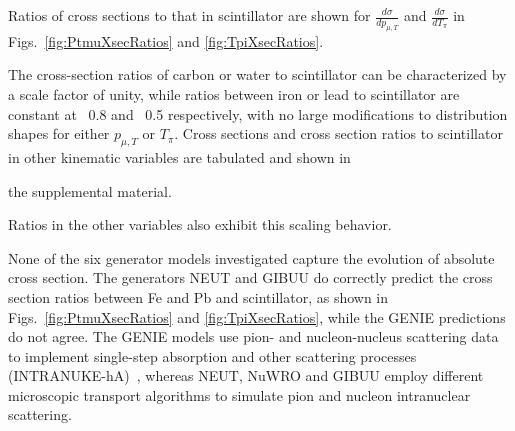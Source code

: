 \documentclass[aps,preprint,showpacs,superscriptaddress,letterpaper,showkeys,superscriptaddress,nofootinbib,floatfix]{revtex4-1}
\newcommand{\firstReviewAdd}[1]{{\bf\color{blue} \protect #1}}
\newcommand{\firstReviewStrike}[1]{{\bf\color{blue}\protect \sout{#1}}}
\newcommand{\firstReviewComment}[1]{{\noindent \bf\color{blue} \small [DAH: #1]}}
\newcommand{\secondReviewAdd}[1]{{\bf\color{purple} \protect #1}}
\newcommand{\firstRefereeAdd}[1]{{\bf\color{green} \protect #1}}
\newcommand{\firstRefereeStrike}[1]{{\bf\color{green}\protect \sout{#1}}}
\renewcommand{\firstReviewComment}[1]{}
\renewcommand{\firstReviewAdd}[1]{\protect #1}
\renewcommand{\firstReviewStrike}[1]{}
\renewcommand{\secondReviewAdd}[1]{\protect #1}
\renewcommand{\firstRefereeAdd}[1]{\protect #1}
\renewcommand{\firstRefereeStrike}[1]{}
\newcommand{\supp}{the supplemental material}
\newif\ifPRLandSupp
\begin{document}
Ratios of cross sections to that in scintillator are shown for $\frac{d\sigma}{dp_{\mu,T}}$ and $\frac{d\sigma}{dT_\pi}$ in Figs.~\ref{fig:PtmuXsecRatios} and \ref{fig:TpiXsecRatios}.  
\firstReviewStrike{These results show \firstReviewStrike{ nearly universal behavior over the range of nuclei studied: that is,}
\firstReviewAdd{that} the cross section ratios are reasonably well described by a \firstReviewStrike{ universal } scale factor of unity in the carbon and water, and by a constant 
$\approx 0.8\secondReviewAdd{\pm 0.1}$ in iron and $\approx 0.5\secondReviewAdd{\pm 0.1}$ in lead
%
with no large modifications to the shape in $p_{\mu,T}$ or $T_\pi$%
The ratios are largely also consistent with \firstReviewStrike{ this universal scaling observation} the same scaling.
}
\firstReviewAdd{The cross-section ratios \firstRefereeAdd{of} carbon or water to scintillator can be characterized by a scale factor of unity, while ratios between iron or lead to scintillator are constant at ~0.8 and ~0.5 respectively, with no large modifications to distribution shapes for either $p_{\mu,T}$ or $T_\pi$.}     
Cross sections and cross section ratios to scintillator in other kinematic variables are tabulated and shown in 
\ifPRLandSupp
\supp\firstRefereeStrike{, sections \ref{section:AbsXsec} and \ref{section:RatioXsec}}.
\else
\supp.
\fi
\firstReviewAdd{Ratios in the other variables  also exhibit this %
scaling behavior.

None of the six generator models investigated capture the evolution of absolute cross section.  %
The generators NEUT\cite{Hayato:2009zz} and GIBUU\cite{Gallmeister:2016dnq} do correctly predict the cross section ratios between Fe and Pb and scintillator, as shown in Figs.~\ref{fig:PtmuXsecRatios} and \ref{fig:TpiXsecRatios}, while the GENIE predictions do not agree.  The GENIE models use pion- and nucleon-nucleus scattering data to implement single-step absorption and other scattering processes (INTRANUKE-hA)~\cite{Andreopoulos:2009rq}, whereas NEUT, NuWRO and GIBUU employ different microscopic transport algorithms to simulate pion and nucleon intranuclear scattering.}
\end{document}
